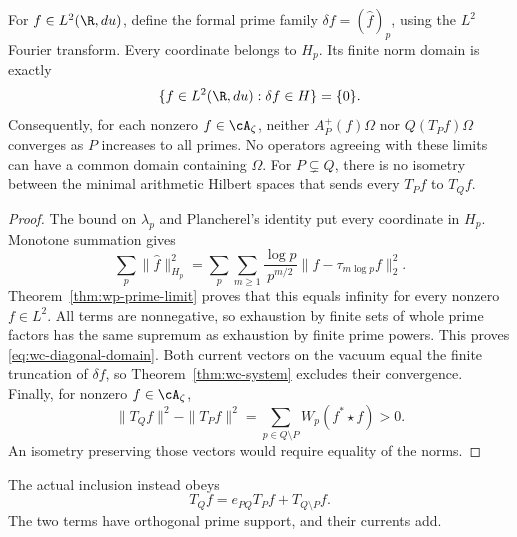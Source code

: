 \begin{proposition}
\label{prop:wc-diagonal-barrier}
For $f\in L^2(\R,du)$, define the formal prime family
$\delta f=(\widehat f)_p$, using the $L^2$ Fourier transform.
Every coordinate belongs to $H_p$.
Its finite norm domain is exactly
\begin{equation}
 \{f\in L^2(\R,du):\delta f\in H\}=\{0\}.
 \label{eq:wc-diagonal-domain}
\end{equation}
Consequently, for each nonzero $f\in\cA_\zeta$, neither
$A_P^+(f)\Omega$ nor $Q(T_Pf)\Omega$ converges as $P$ increases to
all primes.  No operators agreeing with these limits can have a common
domain containing $\Omega$.
For $P\subsetneq Q$, there is no isometry between the minimal
arithmetic Hilbert spaces that sends every $T_Pf$ to $T_Qf$.
\end{proposition}
\begin{proof}
The bound on $\lambda_p$ and Plancherel's identity put every coordinate
in $H_p$.  Monotone summation gives
\[
 \sum_p\|\widehat f\|_{H_p}^2
 =\sum_p\sum_{m\geq1}\frac{\log p}{p^{m/2}}
 \|f-\tau_{m\log p}f\|_2^2.
\]
Theorem~\ref{thm:wp-prime-limit} proves that this equals infinity for
every nonzero $f\in L^2$.
All terms are nonnegative, so exhaustion by finite sets of whole prime
factors has the same supremum as exhaustion by finite prime powers.
This proves \eqref{eq:wc-diagonal-domain}.
Both current vectors on the vacuum equal the finite truncation of
$\delta f$, so Theorem~\ref{thm:wc-system} excludes their convergence.
Finally, for nonzero $f\in\cA_\zeta$,
\[
 \|T_Qf\|^2-\|T_Pf\|^2
 =\sum_{p\in Q\setminus P}W_p(f^*\star f)>0.
\]
An isometry preserving those vectors would require equality of the norms.
\end{proof}

The actual inclusion instead obeys
\[
 T_Qf=e_{PQ}T_Pf+T_{Q\setminus P}f.
\]
The two terms have orthogonal prime support, and their currents add.

